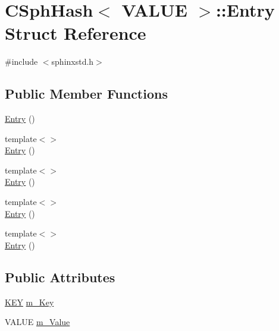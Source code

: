 \hypertarget{structCSphHash_1_1Entry}{\section{C\-Sph\-Hash$<$ V\-A\-L\-U\-E $>$\-:\-:Entry Struct Reference}
\label{structCSphHash_1_1Entry}
}


{\ttfamily \#include $<$sphinxstd.\-h$>$}

\subsection*{Public Member Functions}
\begin{DoxyCompactItemize}
\item 
\hyperlink{structCSphHash_1_1Entry_a0b55819e1b41577d4e3df43e2c31aeb2}{Entry} ()
\item 
{\footnotesize template$<$$>$ }\\\hyperlink{structCSphHash_1_1Entry_ab407085c569dc566da69d51e5492c146}{Entry} ()
\item 
{\footnotesize template$<$$>$ }\\\hyperlink{structCSphHash_1_1Entry_af9afd61d0e049c2644ebb426f5962c01}{Entry} ()
\item 
{\footnotesize template$<$$>$ }\\\hyperlink{structCSphHash_1_1Entry_a1db1a9a001b010d6c3c1943a1cd62021}{Entry} ()
\item 
{\footnotesize template$<$$>$ }\\\hyperlink{structCSphHash_1_1Entry_af157c9c2d2e23b65d26b78d502b80245}{Entry} ()
\end{DoxyCompactItemize}
\subsection*{Public Attributes}
\begin{DoxyCompactItemize}
\item 
\hyperlink{classCSphHash_a59a1412d2e0498b2a7417c7adf5d7041}{K\-E\-Y} \hyperlink{structCSphHash_1_1Entry_afc39ef6957b208b6ee05263cb73bb665}{m\-\_\-\-Key}
\item 
V\-A\-L\-U\-E \hyperlink{structCSphHash_1_1Entry_a3451f5103614bb6d347f69366620d318}{m\-\_\-\-Value}
\end{DoxyCompactItemize}


